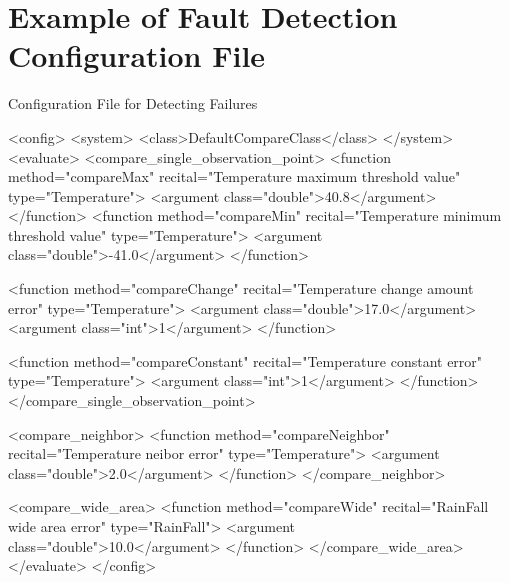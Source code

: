 
\section{Example of Fault Detection Configuration File}

\makeendnotes

Configuration File for Detecting Failures
{\small
\begin{verbatimtab}
<config>
<system>
<class>DefaultCompareClass</class>
</system>
<evaluate>
<compare_single_observation_point>
<function method="compareMax" recital="Temperature maximum threshold value"
type="Temperature"> <argument class="double">40.8</argument>
</function>
<function method="compareMin" recital="Temperature minimum threshold value"
type="Temperature"> <argument class="double">-41.0</argument>
</function>

<function method="compareChange" recital="Temperature change amount error"
type="Temperature"> <argument class="double">17.0</argument>
<argument class="int">1</argument>
</function>

<function method="compareConstant" recital="Temperature constant error"
type="Temperature"> <argument class="int">1</argument>
</function>
</compare_single_observation_point>

<compare_neighbor>
<function method="compareNeighbor" recital="Temperature neibor error"
type="Temperature"> <argument class="double">2.0</argument>
</function>
</compare_neighbor>

<compare_wide_area>
<function method="compareWide" recital="RainFall wide area error"
type="RainFall"> <argument class="double">10.0</argument>
</function>
</compare_wide_area>
</evaluate>
</config>
\end{verbatimtab}
}

\putendnotes

